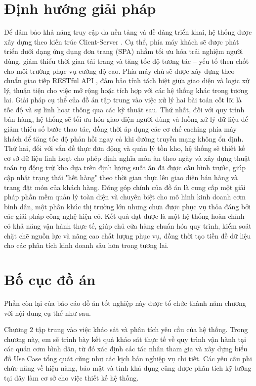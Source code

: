 \documentclass[../20232006p.tex]{subfiles}
\begin{document}
\section{Định hướng giải pháp}
\label{section:1.3}
Để đảm bảo khả năng truy cập đa nền tảng và dễ dàng triển khai, hệ thống được xây dựng theo kiến trúc Client-Server \cite{tanenbaum2010computer}. Cụ thể, phía máy khách sẽ được phát triển dưới dạng ứng dụng đơn trang (SPA) nhằm tối ưu hóa trải nghiệm người dùng, giảm thiểu thời gian tải trang và tăng tốc độ tương tác – yếu tố then chốt cho môi trường phục vụ cường độ cao. Phía máy chủ sẽ được xây dựng theo chuẩn giao tiếp RESTful API \cite{fielding2000restful}, đảm bảo tính tách biệt giữa giao diện và logic xử lý, thuận tiện cho việc mở rộng hoặc tích hợp với các hệ thống khác trong tương lai. Giải pháp cụ thể của đồ án tập trung vào việc xử lý hai bài toán cốt lõi là tốc độ và sự linh hoạt thông qua các kỹ thuật sau. Thứ nhất, đối với quy trình bán hàng, hệ thống sẽ tối ưu hóa giao diện người dùng và luồng xử lý dữ liệu để giảm thiểu số bước thao tác, đồng thời áp dụng các cơ chế caching phía máy khách để tăng tốc độ phản hồi ngay cả khi đường truyền mạng không ổn định. Thứ hai, đối với vấn đề thực đơn động và quản lý tồn kho, hệ thống sẽ thiết kế cơ sở dữ liệu linh hoạt cho phép định nghĩa món ăn theo ngày và xây dựng thuật toán tự động trừ kho dựa trên định lượng suất ăn đã được cấu hình trước, giúp cập nhật trạng thái "hết hàng" theo thời gian thực lên giao diện bán hàng và trang đặt món của khách hàng. Đóng góp chính của đồ án là cung cấp một giải pháp phần mềm quản lý toàn diện và chuyên biệt cho mô hình kinh doanh cơm bình dân, một phân khúc thị trường lớn nhưng chưa được phục vụ thỏa đáng bởi các giải pháp công nghệ hiện có. Kết quả đạt được là một hệ thống hoàn chỉnh có khả năng vận hành thực tế, giúp chủ cửa hàng chuẩn hóa quy trình, kiểm soát chặt chẽ nguồn lực và nâng cao chất lượng phục vụ, đồng thời tạo tiền đề dữ liệu cho các phân tích kinh doanh sâu hơn trong tương lai.
\section{Bố cục đồ án}
\label{section:1.4}
Phần còn lại của báo cáo đồ án tốt nghiệp này được tổ chức thành năm chương với nội dung cụ thể như sau.

Chương 2 tập trung vào việc khảo sát và phân tích yêu cầu của hệ thống. Trong chương này, em sẽ trình bày kết quả khảo sát thực tế về quy trình vận hành tại các quán cơm bình dân, từ đó xác định các tác nhân tham gia và xây dựng biểu đồ Use Case tổng quát cũng như các kịch bản nghiệp vụ chi tiết. Các yêu cầu phi chức năng về hiệu năng, bảo mật và tính khả dụng cũng được phân tích kỹ lưỡng tại đây làm cơ sở cho việc thiết kế hệ thống.
\end{document}
